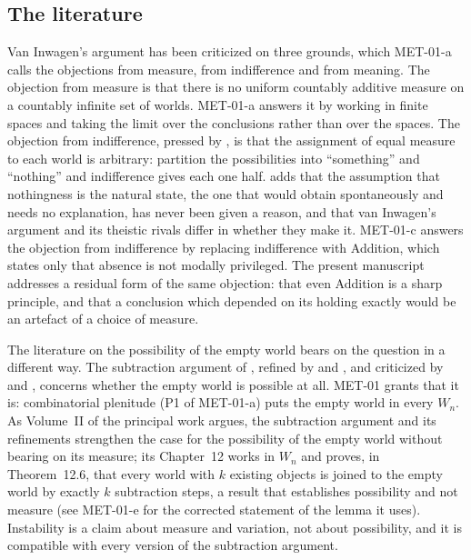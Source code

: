 \documentclass{situationist-preprint}
\begin{document}
\subsection{The literature}

Van Inwagen's argument has been criticized on three grounds, which MET-01-a calls the objections from measure, from indifference and from meaning. The objection from measure is that there is no uniform countably additive measure on a countably infinite set of worlds. MET-01-a answers it by working in finite spaces and taking the limit over the conclusions rather than over the spaces. The objection from indifference, pressed by \citet{Lowe1996}, is that the assignment of equal measure to each world is arbitrary: partition the possibilities into \enquote{something} and \enquote{nothing} and indifference gives each one half. \citet{Grunbaum2004} adds that the assumption that nothingness is the natural state, the one that would obtain spontaneously and needs no explanation, has never been given a reason, and that van Inwagen's argument and its theistic rivals differ in whether they make it. MET-01-c answers the objection from indifference by replacing indifference with Addition, which states only that absence is not modally privileged. The present manuscript addresses a residual form of the same objection: that even Addition is a sharp principle, and that a conclusion which depended on its holding exactly would be an artefact of a choice of measure.

The literature on the possibility of the empty world bears on the question in a different way. The subtraction argument of \citet{Baldwin1996}, refined by \citet{RodriguezPereyra1997} and \citet{EfirdStoneham2005}, and criticized by \citet{Paseau2006} and \citet{Coggins2010}, concerns whether the empty world is possible at all. MET-01 grants that it is: combinatorial plenitude (P1 of MET-01-a) puts the empty world in every $W_n$. As Volume~II of the principal work argues, the subtraction argument and its refinements strengthen the case for the possibility of the empty world without bearing on its measure; its Chapter~12 works in $W_n$ and proves, in Theorem~12.6, that every world with $k$ existing objects is joined to the empty world by exactly $k$ subtraction steps, a result that establishes possibility and not measure (see MET-01-e for the corrected statement of the lemma it uses). Instability is a claim about measure and variation, not about possibility, and it is compatible with every version of the subtraction argument.
\end{document}
